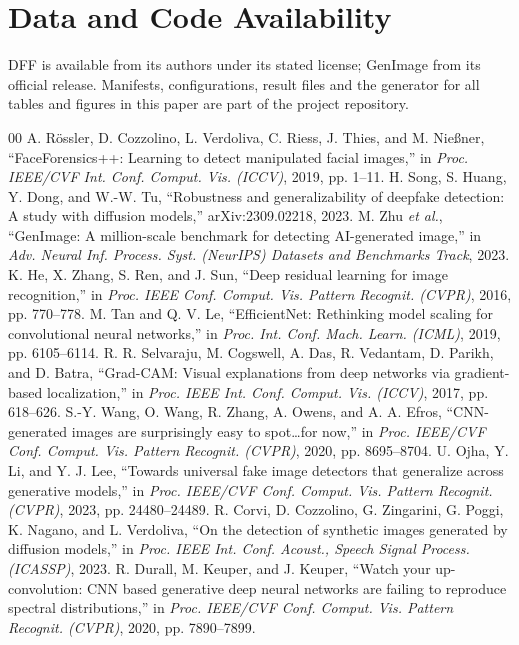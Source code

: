 \documentclass[conference]{IEEEtran}
\begin{document}
\section*{Data and Code Availability}
DFF is available from its authors under its stated license; GenImage from its official release. Manifests, configurations, result files and the generator for all tables and figures in this paper are part of the project repository.

\begin{thebibliography}{00}
 A. R\"ossler, D. Cozzolino, L. Verdoliva, C. Riess, J. Thies, and M. Nie{\ss}ner, ``FaceForensics++: Learning to detect manipulated facial images,'' in \textit{Proc. IEEE/CVF Int. Conf. Comput. Vis. (ICCV)}, 2019, pp. 1--11.
 H. Song, S. Huang, Y. Dong, and W.-W. Tu, ``Robustness and generalizability of deepfake detection: A study with diffusion models,'' arXiv:2309.02218, 2023.
 M. Zhu \textit{et al.}, ``GenImage: A million-scale benchmark for detecting AI-generated image,'' in \textit{Adv. Neural Inf. Process. Syst. (NeurIPS) Datasets and Benchmarks Track}, 2023.
 K. He, X. Zhang, S. Ren, and J. Sun, ``Deep residual learning for image recognition,'' in \textit{Proc. IEEE Conf. Comput. Vis. Pattern Recognit. (CVPR)}, 2016, pp. 770--778.
 M. Tan and Q. V. Le, ``EfficientNet: Rethinking model scaling for convolutional neural networks,'' in \textit{Proc. Int. Conf. Mach. Learn. (ICML)}, 2019, pp. 6105--6114.
 R. R. Selvaraju, M. Cogswell, A. Das, R. Vedantam, D. Parikh, and D. Batra, ``Grad-CAM: Visual explanations from deep networks via gradient-based localization,'' in \textit{Proc. IEEE Int. Conf. Comput. Vis. (ICCV)}, 2017, pp. 618--626.
 S.-Y. Wang, O. Wang, R. Zhang, A. Owens, and A. A. Efros, ``CNN-generated images are surprisingly easy to spot\ldots for now,'' in \textit{Proc. IEEE/CVF Conf. Comput. Vis. Pattern Recognit. (CVPR)}, 2020, pp. 8695--8704.
 U. Ojha, Y. Li, and Y. J. Lee, ``Towards universal fake image detectors that generalize across generative models,'' in \textit{Proc. IEEE/CVF Conf. Comput. Vis. Pattern Recognit. (CVPR)}, 2023, pp. 24480--24489.
 R. Corvi, D. Cozzolino, G. Zingarini, G. Poggi, K. Nagano, and L. Verdoliva, ``On the detection of synthetic images generated by diffusion models,'' in \textit{Proc. IEEE Int. Conf. Acoust., Speech Signal Process. (ICASSP)}, 2023.
 R. Durall, M. Keuper, and J. Keuper, ``Watch your up-convolution: CNN based generative deep neural networks are failing to reproduce spectral distributions,'' in \textit{Proc. IEEE/CVF Conf. Comput. Vis. Pattern Recognit. (CVPR)}, 2020, pp. 7890--7899.

\end{thebibliography}
\end{document}
